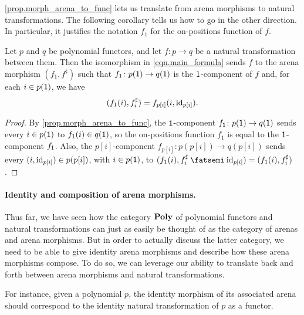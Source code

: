 \documentclass[Book-Poly]{subfiles}
\begin{document}

\cref{prop.morph_arena_to_func} lets us translate from arena morphisms to natural transformations.
The following corollary tells us how to go in the other direction.
In particular, it justifies the notation $f_1$ for the on-positions function of $f$.

\begin{corollary} \label{prop.morph_func_to_arena}
Let $p$ and $q$ be polynomial functors, and let $f \colon p \to q$ be a natural transformation between them.
Then the isomorphism in \eqref{eqn.main_formula} sends $f$ to the arena morphism $(f_1, f^\sharp)$ such that $f_1 \colon p(\textsf{1}) \to q(\textsf{1})$ is the $\textsf{1}$-component of $f$ and, for each $i \in p(\textsf{1})$, we have
\[
    (f_1(i), f^\sharp_i) = f_{p[i]}(i, \mathrm{id}_{p[i]}).
\]
\end{corollary}
\begin{proof}
By \cref{prop.morph_arena_to_func}, the $\textsf{1}$-component $f_{\textsf{1}} \colon p(\textsf{1}) \to q(\textsf{1})$ sends every $i \in p(\textsf{1})$ to $f_1(i) \in q(\textsf{1})$, so the on-positions function $f_1$ is equal to the $\textsf{1}$-component $f_{\textsf{1}}$.
Also, the $p[i]$-component $f_{p[i]} \colon p(p[i]) \to q(p[i])$ sends every $(i, \mathrm{id}_{p[i]}) \in p(p[i])$, with $i \in p(\textsf{1})$, to $(f_1(i), f^\sharp_i \then \id_{p[i]}) = (f_1(i), f^\sharp_i)$.
\end{proof}


\paragraph{Identity and composition of arena morphisms.}

Thus far, we have seen how the category $\textbf{Poly}$ of polynomial functors and natural transformations can just as easily be thought of as the category of arenas and arena morphisms.
But in order to actually discuss the latter category, we need to be able to give identity arena morphisms and describe how these arena morphisms compose.
To do so, we can leverage our ability to translate back and forth between arena morphisms and natural transformations.

For instance, given a polynomial $p$, the identity morphism of its associated arena should correspond to the identity natural transformation of $p$ as a functor.
\end{document}
